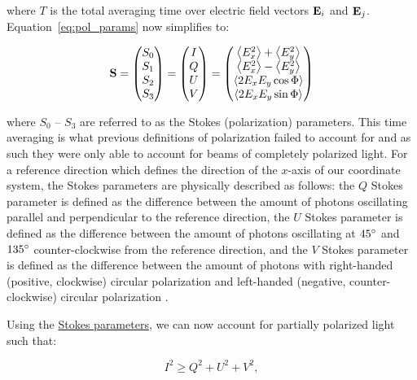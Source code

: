 \noindent where $T$ is the total averaging time over electric field vectors $\mathbf{E}_{i}$ and $\mathbf{E}_{j}$. Equation~\ref{eq:pol_params} now simplifies to:

\begin{equation}
    \mathbf{S} =
    \begin{pmatrix}
        S_{0} \\
        S_{1} \\
        S_{2} \\
        S_{3}
    \end{pmatrix}
    =
    \begin{pmatrix}
        I \\
        Q \\
        U \\
        V
    \end{pmatrix}
    =
    \begin{pmatrix}
        \left< E_{x}^{2} \right> + \left< E_{y}^{2} \right> \\
        \left< E_{x}^{2} \right> - \left< E_{y}^{2} \right> \\
        \left< 2 E_{x} E_{y} \cos \Phi \right>     \\
        \left< 2 E_{x} E_{y} \sin \Phi \right>
    \end{pmatrix}
    \label{eq:Stokes_params}
\end{equation}

\noindent where $S_{0}$ -- $ S_{3}$ are referred to as the Stokes (polarization) parameters. This time averaging is what previous definitions of polarization failed to account for and as such they were only able to account for beams of completely polarized light. For a reference direction which defines the direction of the $x$-axis of our coordinate system, the Stokes parameters are physically described as follows: the $Q$ Stokes parameter is defined as the difference between the amount of photons oscillating parallel and perpendicular to the reference direction, the $U$ Stokes parameter is defined as the difference between the amount of photons oscillating at $45\hbox{$^\circ$}$ and $135\hbox{$^\circ$}$ counter-clockwise from the reference direction, and the $V$ Stokes parameter is defined as the difference between the amount of photons with right-handed (positive, clockwise) circular polarization and left-handed (negative, counter-clockwise) circular polarization \citep{Stokes}.
\prgph

Using the \hyperref[eq:Stokes_params]{Stokes parameters}, we can now account for partially polarized light such that:

\begin{equation}
    I^{2} \geq  Q^{2} + U^{2} + V^{2},
\end{equation}

